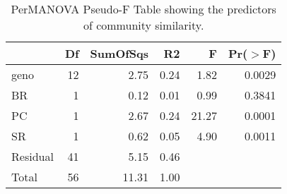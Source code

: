 \begin{table}[ht]
\centering
\begin{tabular}{lrrrrr}
  \hline
 & Df & SumOfSqs & R2 & F & Pr($>$F) \\ 
  \hline
geno & 12 & 2.75 & 0.24 & 1.82 & 0.0029 \\ 
  BR & 1 & 0.12 & 0.01 & 0.99 & 0.3841 \\ 
  PC & 1 & 2.67 & 0.24 & 21.27 & 0.0001 \\ 
  SR & 1 & 0.62 & 0.05 & 4.90 & 0.0011 \\ 
  Residual & 41 & 5.15 & 0.46 &  &  \\ 
  Total & 56 & 11.31 & 1.00 &  &  \\ 
   \hline
\end{tabular}
\caption{PerMANOVA Pseudo-F Table showing the predictors of community similarity.} 
\label{tab:rcom_perm}
\end{table}

